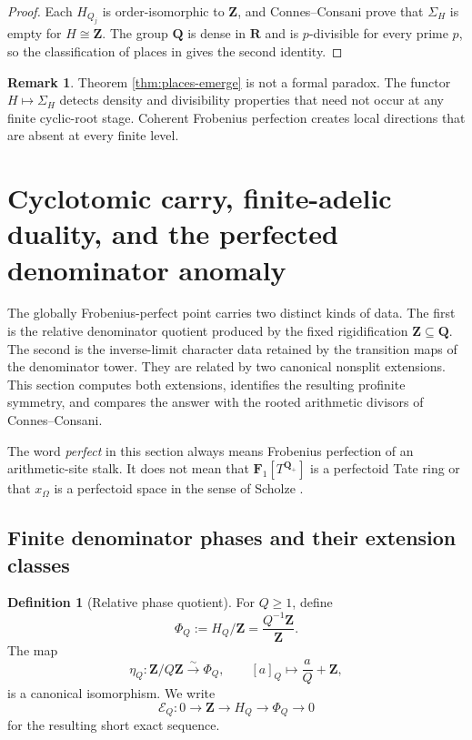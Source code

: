 \documentclass[11pt]{amsart}
\numberwithin{equation}{section}
\theoremstyle{definition}
\newtheorem{definition}[theorem]{Definition}
\newtheorem{remark}[theorem]{Remark}
\newcommand{\Z}{\mathbf Z}
\newcommand{\Q}{\mathbf Q}
\newcommand{\R}{\mathbf R}
\newcommand{\Fone}{\mathbf F_1}
\begin{document}
\begin{proof}
Each $H_{Q_j}$ is order-isomorphic to $\Z$, and Connes--Consani prove that
$\Sigma_H$ is empty for $H\cong\Z$.  The group $\Q$ is dense in $\R$ and
is $p$-divisible for every prime $p$, so the classification of places in
\cite{CCAbsolute} gives the second identity.
\end{proof}

\begin{remark}
Theorem \ref{thm:places-emerge} is not a formal paradox.  The functor
$H\mapsto\Sigma_H$ detects density and divisibility properties that need
not occur at any finite cyclic-root stage.  Coherent Frobenius perfection
creates local directions that are absent at every finite level.
\end{remark}

\section{Cyclotomic carry, finite-adelic duality, and the perfected denominator anomaly}
\label{sec:perfected-anomaly}

The globally Frobenius-perfect point carries two distinct kinds of data.
The first is the relative denominator quotient produced by the fixed
rigidification $\Z\subseteq\Q$.  The second is the inverse-limit character
data retained by the transition maps of the denominator tower.  They are
related by two canonical nonsplit extensions.  This section computes both
extensions, identifies the resulting profinite symmetry, and compares the
answer with the rooted arithmetic divisors of Connes--Consani.

The word \emph{perfect} in this section always means Frobenius perfection
of an arithmetic-site stalk.  It does not mean that
$\Fone[T^{\Q_+}]$ is a perfectoid Tate ring or that $x_\Omega$ is a
perfectoid space in the sense of Scholze \cite{ScholzePerfectoid}.

\subsection{Finite denominator phases and their extension classes}

\begin{definition}[Relative phase quotient]
\label{def:finite-phase-quotient}
For $Q\geq1$, define
\[
\Phi_Q:=H_Q/\Z=\frac{Q^{-1}\Z}{\Z}.
\]
The map
\[
\eta_Q:\Z/Q\Z\xrightarrow{\sim}\Phi_Q,
\qquad
[a]_Q\longmapsto \frac aQ+\Z,
\]
is a canonical isomorphism.  We write
\[
\mathcal E_Q:
0\longrightarrow\Z\longrightarrow H_Q
\longrightarrow\Phi_Q\longrightarrow0
\]
for the resulting short exact sequence.
\end{definition}
\end{document}
